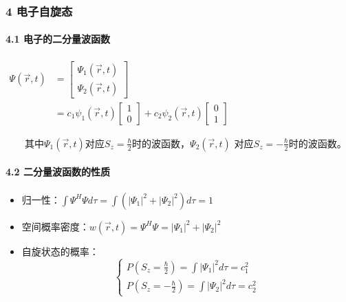 \documentclass[UTF8,twocolumn]{ctexart}
\providecommand{\tightlist}{%
  \setlength{\itemsep}{0pt}\setlength{\parskip}{0pt}}
\let\oldparagraph\paragraph
\renewcommand{\paragraph}[1]{\oldparagraph{#1}\mbox{}}
\begin{document}
\hypertarget{ux7535ux5b50ux81eaux65cbux6001}{%
\subsubsection{4 电子自旋态}\label{ux7535ux5b50ux81eaux65cbux6001}}

\hypertarget{ux7535ux5b50ux7684ux4e8cux5206ux91cfux6ce2ux51fdux6570}{%
\paragraph{ 4.1
电子的二分量波函数}\label{ux7535ux5b50ux7684ux4e8cux5206ux91cfux6ce2ux51fdux6570}}

\begin{center}
  $\begin{aligned}
  \Psi(\vec{r},t)&=\left[
  \begin{matrix}
    \Psi_1(\vec{r},t) \\ \Psi_2(\vec{r},t)
  \end{matrix}\right] \\
  &=c_1\psi_1(\vec{r},t)\left[
  \begin{matrix}
    1 \\ 0
  \end{matrix}\right]
  +c_2\psi_2(\vec{r},t)\left[
  \begin{matrix}
    0 \\ 1
  \end{matrix}\right]
\end{aligned}$

\end{center}

  其中\(\Psi_1(\vec{r},t)\)对应\(S_z=\frac{\hbar}{2}\)时的波函数，\(\Psi_2(\vec{r},t)\) 对应\(S_z=-\frac{\hbar}{2}\)时的波函数。

\hypertarget{ux4e8cux5206ux91cfux6ce2ux51fdux6570ux7684ux6027ux8d28}{%
\paragraph{ 4.2
二分量波函数的性质}\label{ux4e8cux5206ux91cfux6ce2ux51fdux6570ux7684ux6027ux8d28}}

\begin{itemize}
\tightlist
\item
  归一性：\(\int\Psi^H\Psi d\tau=\int(|\Psi_1|^2+|\Psi_2|^2)d\tau=1\)
\item
  空间概率密度：\(w(\vec{r},t)=\Psi^H\Psi=|\Psi_1|^2+|\Psi_2|^2\)
\item
  自旋状态的概率： \[\begin{cases}
    P(S_z=\frac{\hbar}{2})=\int|\Psi_1|^2d\tau=c_1^2 \\
    P(S_z=-\frac{\hbar}{2})=\int|\Psi_2|^2d\tau=c_2^2
  \end{cases}\]
\end{itemize}
\end{document}

